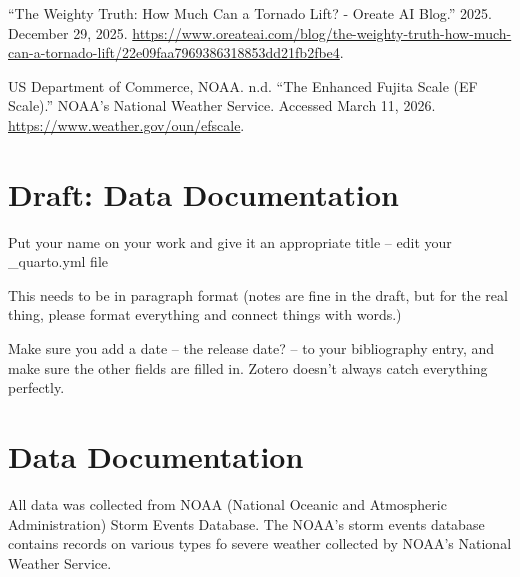 \documentclass[
  letterpaper,
  DIV=11,
  numbers=noendperiod]{scrreprt}
\newlength{\cslhangindent}
\newenvironment{CSLReferences}[2] %
 {\begin{list}{}{%
  \setlength{\itemindent}{0pt}
  \setlength{\leftmargin}{0pt}
  \setlength{\parsep}{0pt}
  \ifodd #1
   \setlength{\leftmargin}{\cslhangindent}
   \setlength{\itemindent}{-1\cslhangindent}
  \fi
  \setlength{\itemsep}{#2\baselineskip}}}
 {\end{list}}
\begin{document}
\begin{CSLReferences}{1}{0}
{``The Weighty Truth: How Much Can a Tornado Lift? - Oreate {AI}
Blog.''} 2025. December 29, 2025.
\url{https://www.oreateai.com/blog/the-weighty-truth-how-much-can-a-tornado-lift/22e09faa7969386318853dd21fb2fbe4}.

US Department of Commerce, NOAA. n.d. {``The Enhanced Fujita Scale ({EF}
Scale).''} {NOAA}'s National Weather Service. Accessed March 11, 2026.
\url{https://www.weather.gov/oun/efscale}.

\end{CSLReferences}

\cleardoublepage
{}
{}
\appendix

\chapter{Draft: Data Documentation}\label{draft-data-documentation}

\begin{tcolorbox}[enhanced jigsaw, coltitle=black, leftrule=.75mm, colframe=quarto-callout-note-color-frame, bottomtitle=1mm, bottomrule=.15mm, arc=.35mm, colback=white, colbacktitle=quarto-callout-note-color!10!white, titlerule=0mm, opacitybacktitle=0.6, breakable, toptitle=1mm, title=\textcolor{quarto-callout-note-color}{\faInfo}\hspace{0.5em}{Note}, left=2mm, toprule=.15mm, rightrule=.15mm, opacityback=0]

Put your name on your work and give it an appropriate title -- edit your
\_quarto.yml file

This needs to be in paragraph format (notes are fine in the draft, but
for the real thing, please format everything and connect things with
words.)

Make sure you add a date -- the release date? -- to your bibliography
entry, and make sure the other fields are filled in. Zotero doesn't
always catch everything perfectly.

\end{tcolorbox}

\chapter{Data Documentation}\label{data-documentation-1}

All data was collected from NOAA (National Oceanic and Atmospheric
Administration) Storm Events Database. The NOAA's storm events database
contains records on various types fo severe weather collected by NOAA's
National Weather Service.
\end{document}
